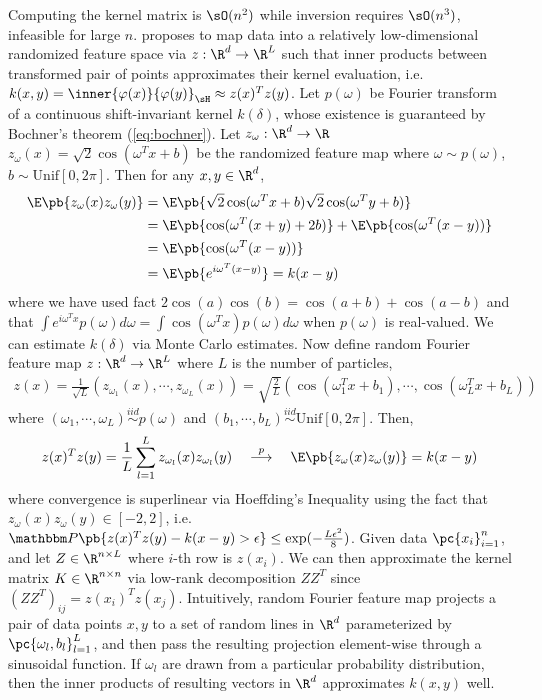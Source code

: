 \documentclass[11pt]{article}
\begin{document}
Computing the kernel matrix is $\sO(n^2)$ while inversion requires $\sO(n^3)$, infeasible for large $n$. \cite{rahimiRandomFeaturesLargeScale2007} proposes to map data into a relatively low-dimensional randomized feature space via $z:\R^d\to\R^L$ such that inner products between transformed pair of points approximates their kernel evaluation, i.e. $k(x,y) = \inner{\varphi(x)}{\varphi(y)}_{\sH} \approx z(x)^Tz(y)$. Let $p(\omega)$ be Fourier transform of a continuous shift-invariant kernel $k(\delta)$, whose existence is guaranteed by Bochner's theorem (\ref{eq:bochner}). Let $z_{\omega}:\R^d\to \R$ $z_{\omega}(x) = \sqrt{2}\cos(\omega^Tx+b)$ be the randomized feature map where $\omega\sim p(\omega)$, $b\sim \text{Unif}[0,2\pi]$. Then for any $x,y\in\R^d$,
\begin{align*}
    \E\pb{z_{\omega}(x)z_{\omega}(y)}
        &= \E\pb{ \sqrt{2} \cos(\omega^T x + b) \sqrt{2}\cos(\omega^Ty+b) } \\
        &= \E\pb{ \cos(\omega^T(x+y)+2b) } + \E\pb{ \cos(\omega^T(x-y)) } \\
        &= \E\pb{ \cos(\omega^T(x-y)) } \\
        &= \E\pb{ e^{i\omega^T(x-y)} } = k(x-y)
\end{align*}
where we have used fact $2\cos(a)\cos(b)=\cos(a+b)+\cos(a-b)$ and that $\int e^{i\omega^Tx} p(\omega)d\omega = \int \cos(\omega^Tx) p(\omega)d\omega$ when $p(\omega)$ is real-valued. We can estimate $k(\delta)$ via Monte Carlo estimates. Now define random Fourier feature map $z:\R^d\to\R^L$ where $L$ is the number of particles,
\begin{align}
    z(x)
        = \frac{1}{\sqrt{L}} (z_{\omega_1}(x), \cdots, z_{\omega_L}(x)) 
        = \sqrt{\frac{2}{L}}(\cos(\omega_1^Tx+b_1), \cdots, \cos(\omega_L^Tx+b_L))
\end{align}
where $(\omega_1,\cdots,\omega_L) \overset{iid}{\sim} p(\omega)$ and $(b_1,\cdots,b_L)\overset{iid}{\sim} \text{Unif}[0,2\pi]$. Then,
\begin{align}
    z(x)^Tz(y)
        = \frac{1}{L} \sum_{l=1}^L z_{\omega_l}(x) z_{\omega_l}(y)
        \quad\overset{p}{\longrightarrow}\quad 
        \E\pb{z_{\omega}(x)z_{\omega}(y)}
        = k(x-y)
\end{align}
where convergence is superlinear via Hoeffding's Inequality using the fact that $z_{\omega}(x)z_{\omega}(y) \in [-2,2]$, i.e. $\bbP\pb{ z(x)^Tz(y) - k(x-y) > \epsilon } \leq \exp(-\frac{L\epsilon^2}{8})$. Given data $\pc{x_i}_{i=1}^n$, and let $Z\in\R^{n\times L}$ where $i$-th row is $z(x_i)$. We can then approximate the kernel matrix $K\in\R^{n\times n}$ via low-rank decomposition $ZZ^T$ since $(ZZ^T)_{ij} = z(x_i)^T z(x_j)$. Intuitively, random Fourier feature map projects a pair of data points $x,y$ to a set of random lines in $\R^d$ parameterized by $\pc{\omega_l,b_l}_{l=1}^L$, and then pass the resulting projection element-wise through a sinusoidal function. If $\omega_l$ are drawn from a particular probability distribution, then the inner products of resulting vectors in $\R^d$ approximates $k(x,y)$ well.
\end{document}
